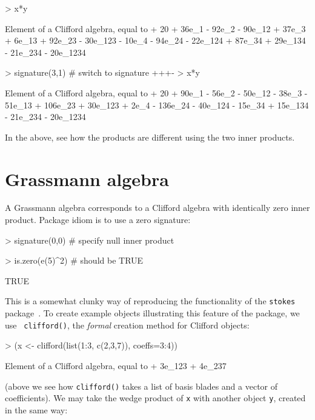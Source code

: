 \documentclass{birkjour}
\theoremstyle{definition}
\theoremstyle{remark}
\numberwithin{equation}{section}
\renewenvironment{Schunk}{\vspace{20pt}}{\vspace{20pt}}
\begin{document}
\begin{Schunk}
\begin{Sinput}
> x*y
\end{Sinput}
\begin{Soutput}
Element of a Clifford algebra, equal to
+ 20 + 36e_1 - 92e_2 - 90e_12 + 37e_3 + 6e_13 + 92e_23 - 30e_123 -
10e_4 - 94e_24 - 22e_124 + 87e_34 + 29e_134 - 21e_234 - 20e_1234
\end{Soutput}
\begin{Sinput}
> signature(3,1)  # switch to signature +++-
> x*y
\end{Sinput}
\begin{Soutput}
Element of a Clifford algebra, equal to
+ 20 + 90e_1 - 56e_2 - 50e_12 - 38e_3 - 51e_13 + 106e_23 + 30e_123 +
2e_4 - 136e_24 - 40e_124 - 15e_34 + 15e_134 - 21e_234 - 20e_1234
\end{Soutput}
\end{Schunk}
%
In the above, see how the products are different using the two inner
products.  

\section{Grassmann algebra}

A Grassmann algebra corresponds to a Clifford algebra with identically
zero inner product.  Package idiom is to use a zero signature:

\begin{Schunk}
\begin{Sinput}
> signature(0,0)  # specify null inner product
\end{Sinput}
\end{Schunk}
\begin{Schunk}
\begin{Sinput}
> is.zero(e(5)^2)     # should be TRUE
\end{Sinput}
\begin{Soutput}
[1] TRUE
\end{Soutput}
\end{Schunk}
%
This is a somewhat clunky way of reproducing the functionality of the
{\tt stokes} package~\cite{hankin2022_stokes_arxiv}.  To create
example objects illustrating this feature of the package, we use {\tt
  clifford()}, the {\em formal} creation method for Clifford objects:

\begin{Schunk}
\begin{Sinput}
> (x <- clifford(list(1:3, c(2,3,7)), coeffs=3:4))
\end{Sinput}
\begin{Soutput}
Element of a Clifford algebra, equal to
+ 3e_123 + 4e_237
\end{Soutput}
\end{Schunk}
%
(above we see how {\tt clifford()} takes a list of basis blades and a
vector of coefficients).  We may take the wedge product of {\tt x} with
another object {\tt y}, created in the same way:
\end{document}
